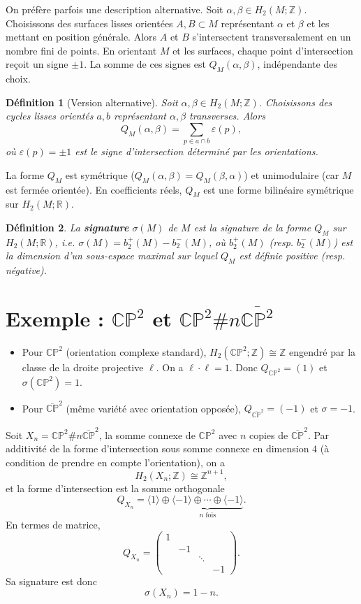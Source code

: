 \documentclass{article}
\newtheorem{definition}{Définition}
\newcommand{\CP}{\mathbb{C}\mathbb{P}}
\newcommand{\Z}{\mathbb{Z}}
\newcommand{\R}{\mathbb{R}}
\begin{document}
On préfère parfois une description alternative. Soit $\alpha, \beta \in H_2(M;\Z)$. Choisissons des surfaces lisses orientées $A,B \subset M$ représentant $\alpha$ et $\beta$ et les mettant en position générale. Alors $A$ et $B$ s'intersectent transversalement en un nombre fini de points. En orientant $M$ et les surfaces, chaque point d'intersection reçoit un signe $\pm 1$. La somme de ces signes est $Q_M(\alpha,\beta)$, indépendante des choix.

\begin{definition}[Version alternative]
Soit $\alpha,\beta \in H_2(M;\Z)$. Choisissons des cycles lisses orientés $a,b$ représentant $\alpha,\beta$ transverses. Alors
\[
Q_M(\alpha,\beta) = \sum_{p \in a \cap b} \varepsilon(p),
\]
où $\varepsilon(p) = \pm 1$ est le signe d'intersection déterminé par les orientations.
\end{definition}

La forme $Q_M$ est symétrique ($Q_M(\alpha,\beta)=Q_M(\beta,\alpha)$) et unimodulaire (car $M$ est fermée orientée). En coefficients réels, $Q_M$ est une forme bilinéaire symétrique sur $H_2(M;\R)$.

\begin{definition}
La \textbf{signature} $\sigma(M)$ de $M$ est la signature de la forme $Q_M$ sur $H_2(M;\R)$, i.e. $\sigma(M) = b_2^+(M) - b_2^-(M)$, où $b_2^+(M)$ (resp. $b_2^-(M)$) est la dimension d'un sous-espace maximal sur lequel $Q_M$ est définie positive (resp. négative).
\end{definition}

\section{Exemple : $\mathbb{CP}^2$ et $\mathbb{CP}^2 \# n\overline{\mathbb{CP}^2}$}

\begin{itemize}
    \item Pour $\CP^2$ (orientation complexe standard), $H_2(\CP^2;\Z) \cong \Z$ engendré par la classe de la droite projective $\ell$. On a $\ell \cdot \ell = 1$. Donc $Q_{\CP^2} = (1)$ et $\sigma(\CP^2)=1$.
    \item Pour $\overline{\CP}^2$ (même variété avec orientation opposée), $Q_{\overline{\CP}^2} = (-1)$ et $\sigma = -1$.
\end{itemize}

Soit $X_n = \CP^2 \# n\overline{\CP}^2$, la somme connexe de $\CP^2$ avec $n$ copies de $\overline{\CP}^2$. Par additivité de la forme d'intersection sous somme connexe en dimension $4$ (à condition de prendre en compte l'orientation), on a
\[
H_2(X_n;\Z) \cong \Z^{n+1},
\]
et la forme d'intersection est la somme orthogonale
\[
Q_{X_n} = \langle 1 \rangle \oplus \underbrace{\langle -1 \rangle \oplus \cdots \oplus \langle -1 \rangle}_{n \text{ fois}}.
\]
En termes de matrice,
\[
Q_{X_n} = \begin{pmatrix}
1 & & & \\
& -1 & & \\
& & \ddots & \\
& & & -1
\end{pmatrix}.
\]
Sa signature est donc
\[
\sigma(X_n) = 1 - n.
\]
\end{document}

